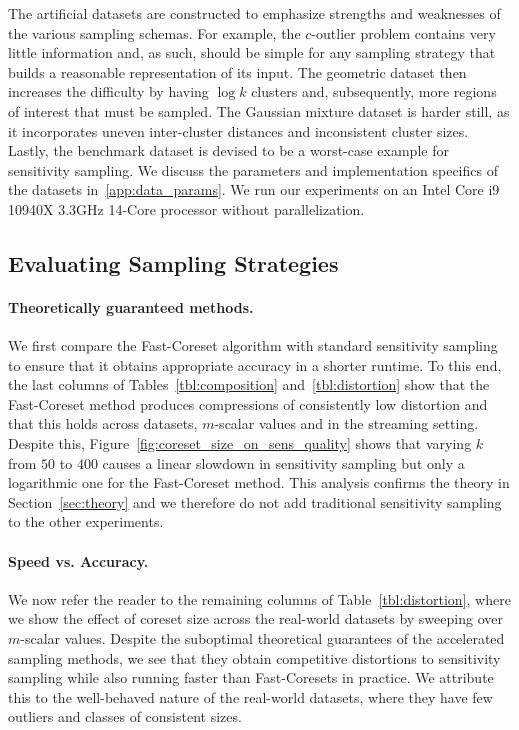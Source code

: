 The artificial datasets are constructed to emphasize strengths and weaknesses of the various sampling schemas. For example, the $c$-outlier problem contains
very little information and, as such, should be simple for any sampling strategy that builds a reasonable representation of its input. The geometric dataset
then increases the difficulty by having $\log k$ clusters and, subsequently, more regions of interest that must be sampled. The Gaussian mixture dataset is
harder still, as it incorporates uneven inter-cluster distances and inconsistent cluster sizes. Lastly, the benchmark dataset is devised to be a worst-case
example for sensitivity sampling. We discuss the parameters and implementation specifics of the datasets in~\cref{app:data_params}. We run our experiments on
an Intel Core i9 10940X 3.3GHz 14-Core processor without parallelization.

\subsection{Evaluating Sampling Strategies}
\label{ssec:alg_qualities}




\paragraph*{Theoretically guaranteed methods.}

We first compare the Fast-Coreset algorithm with standard sensitivity sampling to ensure that it obtains appropriate accuracy in a shorter runtime.  To this
end, the last columns of Tables~\ref{tbl:composition} and~\ref{tbl:distortion} show that the Fast-Coreset method produces compressions of consistently low
distortion and that this holds across datasets, $m$-scalar values and in the streaming setting.  Despite this, Figure~\ref{fig:coreset_size_on_sens_quality}
shows that varying $k$ from $50$ to $400$ causes a linear slowdown in sensitivity sampling but only a logarithmic one for the Fast-Coreset method. This analysis
confirms the theory in Section~\ref{sec:theory} and we therefore do not add traditional sensitivity sampling to the other experiments.

\paragraph*{Speed vs. Accuracy.}

We now refer the reader to the remaining columns of Table~\ref{tbl:distortion}, where we show the effect of coreset size across the real-world datasets by
sweeping over $m$-scalar values. Despite the suboptimal theoretical guarantees of the accelerated sampling methods, we see that they obtain competitive
distortions to sensitivity sampling while also running faster than Fast-Coresets in practice. We attribute this to the well-behaved nature of the real-world
datasets, where they have few outliers and classes of consistent sizes.

